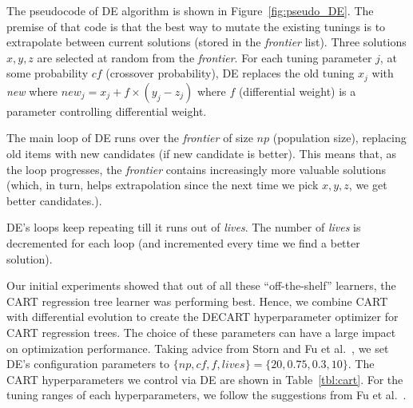 \documentclass[smallextended]{svjour3}
\newcommand{\fig}[1]{Figure~\ref{fig:#1}}
\newcommand{\respto}[1]{
\fcolorbox{black}{black!15}{%
\label{resp:#1}%
\bf\scriptsize R{#1}}}
\begin{document}
The pseudocode of DE algorithm is shown in \fig{pseudo_DE}. The premise of that code is that the best way to mutate the existing tunings is to extrapolate between current solutions (stored in the {\em frontier} list). Three solutions $x, y, z$ are selected at random from the {\em frontier}. For each tuning parameter $j$, at some probability $cf$ (crossover probability), DE  replaces the old tuning $x_j$ with {\em new}  where
\mbox{$\mathit{new}_j = x_j + f \times (y_j - z_j)$}
where $f$ (differential weight) is a parameter controlling differential weight.



 
The main loop of DE runs over the {\em frontier} of size $np$ (population size), replacing old items with new candidates (if new candidate is better). This means that, as the loop progresses, the {\em frontier}  contains increasingly more valuable solutions (which, in turn, helps extrapolation since the next time we pick $x,y,z$, we get better candidates.). 

DE's loops keep repeating till it runs out of {\em lives}. The number of {\em lives} is decremented for each loop (and incremented every time we find a better solution).


Our initial  experiments 
showed that out of all these ``off-the-shelf'' learners, the CART regression tree learner was performing best. Hence, we combine CART with differential evolution to create the DECART hyperparameter  optimizer for CART regression trees. 
The choice of these parameters can have a large impact on optimization performance. Taking advice from  Storn and Fu et al.~\cite{storn1997differential,Fu2016TuningFS}, we set DE's configuration parameters to $\{\mathit{np, cf, f, \mathit{lives}}\}=\{20,0.75,0.3,10\}$. The CART hyperparameters we control via DE are shown in Table~\ref{tbl:cart}. For the tuning ranges of each hyperparameters, we follow the suggestions from Fu et al.~\cite{Fu2016TuningFS}.

\end{document}
